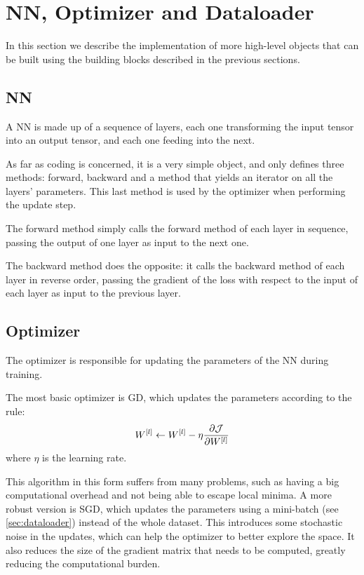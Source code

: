\section{\acl*{NN}, Optimizer and Dataloader} \label{sec:nn-optim-data}
In this section we describe the implementation of more high-level objects that can be built using the building blocks described in the previous sections.

\subsection{\acl*{NN}}
A \acl{NN} is made up of a sequence of layers, each one transforming the input tensor into an output tensor, and each one feeding into the next.

As far as coding is concerned, it is a very simple object, and only defines three methods: forward, backward and a method that yields an iterator on all the layers' parameters. This last method is used by the optimizer when performing the update step.

The forward method simply calls the forward method of each layer in sequence, passing the output of one layer as input to the next one.

The backward method does the opposite: it calls the backward method of each layer in reverse order, passing the gradient of the loss with respect to the input of each layer as input to the previous layer.

\subsection{Optimizer}
The optimizer is responsible for updating the parameters of the \acl{NN} during training.

The most basic optimizer is \ac{GD}, which updates the parameters according to the rule:
\begin{equation}
    W^{[l]} \gets W^{[l]} - \eta \pdv{\mathcal{J}}{W^{[l]}}
\end{equation}
where $\eta$ is the learning rate.

This algorithm in this form suffers from many problems, such as having a big computational overhead and not being able to escape local minima. A more robust version is \ac{SGD}, which updates the parameters using a mini-batch (see \cref{sec:dataloader}) instead of the whole dataset. This introduces some stochastic noise in the updates, which can help the optimizer to better explore the space. It also reduces the size of the gradient matrix that needs to be computed, greatly reducing the computational burden.

